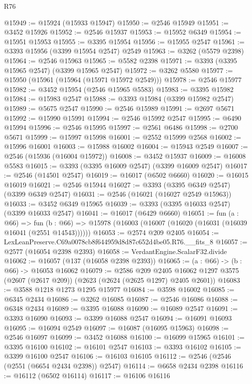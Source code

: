 \begin{lexlean}{R76}
\begin{coremodule}
@15949 := @15924 (@15933 @15947)
@15950 := @2546 @15949
@15951 := @3452 @15926
@15952 := @2546 @15937
@15953 := @15952 @6349
@15954 := @15951 @15953
@15955 := @3395 @15954
@15956 := @15955 @2547
@15961 := @3393 @15956 (@3399 @15954 @2547) @2549
@15963 := @3262 (@5579 @2398)
@15964 := @2546 @15963
@15965 := @5582 @2398
@15971 := @3393 (@3395 @15965 @2547) (@3399 @15965 @2547)
@15972 := @3262 @5580
@15977 := @15950 (@15961 (@15964 (@15971 @15972 @2549)))
@15978 := @2546 @15977
@15982 := @3452 @15954 (@2546 @15965 @5583)
@15983 := @3395 @15982
@15984 := @15983 @2547
@15988 := @3393 @15984 (@3399 @15982 @2547)
@15989 := @5675 @2547
@15990 := @2546 @15989
@15991 := @2697 @5671
@15992 := @15990 @15991
@15994 := @2546 @15992 @2547
@15995 := @6490 @15994
@15996 := @2546 @15995
@15997 := @2561 @6486
@15998 := @2700 @5671
@15999 := @15997 @15998
@16001 := @2552 @15999 @2568
@16002 := @15996 @16001
@16003 := @15988 @16002
@16004 := @15943 @2549
@16007 := @2546 (@15936 (@16004 @15972))
@16008 := @3452 @15937
@16009 := @16008 @5583
@16015 := @3393 (@3395 @16009 @2547) (@3399 @16009 @2547)
@16017 := @2546 (@14501 @2547)
@16019 := @16017 (@6502 @6660)
@16020 := @16015 @16019
@16021 := @2546 @15944
@16027 := @3393 (@3395 @6349 @2547) (@3399 @6349 @2547)
@16031 := @2546 (@16021 (@16027 @2549 @15963))
@16033 := @3452 @6349 @15965
@16039 := @3393 (@3395 @16033 @2547) (@3399 @16033 @2547)
@16041 := @16017 (@6429 @6660)
@16051 := fun (a : @66) =>
  fun (b : @66) => @15978 (@16003 (@16007 (@16020 (@16031 (@16039 @16041 (@2551 @14543))))))
@16053 := @2574 @209 @2405
@16054 := LexLeanPreserve.C69a0078cb8f644959d8d87c652d4be05.R76.__fits_8
@16057 := @2577 (@16054 @2398 @2393)
@16058 := VerdantEngine.ScalarF32.divide
@16062 := @16057 (@137 (@16058 @2398 @2393))
@16065 := (a : @66) -> (b : @66) -> @16053 @16062
@16079 := @2586
    @209
    @2405
    @16062
    @1297
    @3575
    (@2607 (@2617 @209))
    (@2623 (@2624 (@2625 @1297) @2405 @2601))
@16083 := @3588 @1218 @1273 @1295 @15977
@16084 := @3598 @16002
@16085 := @6345 @2434
@16086 := @3262 @16085
@16087 := @2546 @16086
@16088 := @6348 @2434
@16089 := @3395 @16088
@16090 := @16089 @2547
@16091 := @3393 @16090
@16093 := @3399 @16088 @2547
@16094 := @16091 @16093
@16095 := @16094 @2549
@16097 := @16087 (@16095 @15963)
@16098 := @2546 @16097
@16099 := @3452 @16088
@16100 := @16099 @15965
@16101 := @3395 @16100
@16102 := @16101 @2547
@16103 := @3393 @16102
@16105 := @3399 @16100 @2547
@16106 := @16103 @16105
@16112 := @2546 (@2546 (@2551 (@6654 @2434 @2398)) @2547)
@16114 := @6658 @2434 @2398
@16116 := @16112 (@6502 @16114)
@16117 := @16106 @16116

\end{coremodule}
\end{lexlean}

